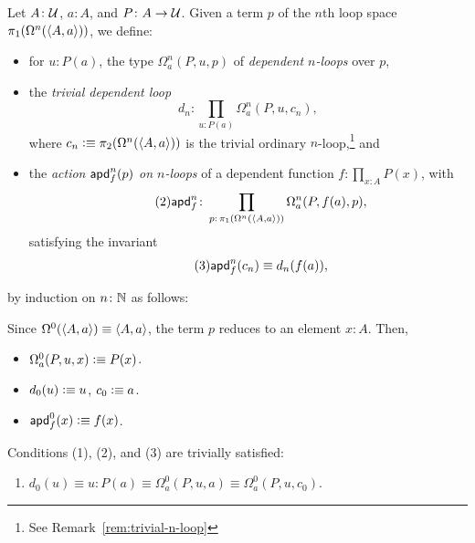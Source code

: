 \begin{defn}\label{defn:dependent-n-loops}
    Let $A\colon\univ$, $a\colon A$, and $P\colon A\to\univ$. Given a term $p$ of the $n$th loop space $\pi_1(\Omega^n(\langle A,a\rangle))$, we define:
    \begin{itemize}
        \item for $u\colon P(a)$, the type $\Omega^n_a(P,u,p)$ of \textsl{dependent $n$-loops} over $p$,
        
        \item the \textsl{trivial dependent loop}
        \begin{equation}\label{eq:dependent-n-loop}\tag{1}
            d_n\colon
                \prod_{u\colon P(a)}\Omega^n_a(P,u,c_n),
        \end{equation}
        where $c_n\mathrel{\vcentcolon}\equiv\pi_2(\Omega^n(\langle A,a\rangle))$ is the trivial ordinary $n$-loop,\footnote{See Remark~\ref{rem:trivial-n-loop}} and
    
        \item the \textsl{action $\mathsf{apd}^n_f(p)$ on $n$-loops} of a dependent function $f\colon\prod_{x\colon A}P(x)$, with
        \begin{equation}\label{eq:apd^n_f}\tag{2}
            \fun{apd}^n_f\colon
                \prod_{p\colon\pi_1(\Omega^n(\dep{A,a}))}
                    \Omega^n_a(P,f(a),p),
        \end{equation}
        satisfying the invariant
        \begin{equation}\label{eq:apd^n_f-invariant}\tag{3}
            \mathsf{apd}^n_f(c_n) \equiv d_n(f(a)),
        \end{equation}
    \end{itemize}
    by induction on $n\colon\N$ as follows:
    
    \begin{description}[font=\normalfont\scshape]
        \item[Base Case ($n=0$):] Since $\Omega^0(\langle A,a\rangle)\equiv\langle A,a\rangle$, the term $p$ reduces to an element $x\colon A$. Then,
        \begin{itemize}
            \item $\Omega^0_a(P,u,x)\mathrel{\vcentcolon}\equiv P(x)$.

            \item $d_0(u)\mathrel{\vcentcolon}\equiv u$, $c_0\mathrel{\vcentcolon}\equiv a$.
            
            \item $\mathsf{apd}^0_f(x)\mathrel{\vcentcolon}\equiv f(x)$.
        \end{itemize}
        Conditions (1), (2), and (3) are trivially satisfied:
        \begin{enumerate}[(1)]
            \item $d_0(u)\equiv u\colon P(a)\equiv\Omega^0_a(P,u,a)\equiv\Omega^0_a(P,u,c_0)$. 
    

\end{enumerate}
\end{description}
\end{defn}
